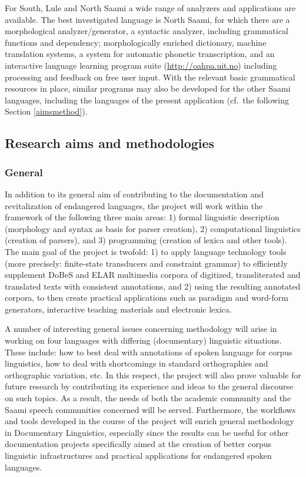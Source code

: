 \documentclass[a4paper,12pt]{article}
\begin{document}
For South, Lule and North Saami a wide range of analyzers and applications are available. The best investigated language is North Saami, for which there are a morphological analyzer/generator, a syntactic analyzer, including grammatical functions and dependency; morphologically enriched dictionary, machine translation systems, a system for automatic phonetic transcription, and an interactive language learning program suite (\url{http://oahpa.uit.no}) including processing and feedback on free user input. With the relevant basic grammatical resources in place, similar programs may also be developed for the other Saami languages, including the languages of the present application (cf.~the following Section \ref{aimsmethod}).

\subsection{Research aims and methodologies}\label{method}
\subsubsection{General}%

In addition to its general aim of contributing to the documentation and revitalization of endangered languages, the project will work within the framework of the following three main areas: 1) formal linguistic description (morphology and syntax as basis for parser creation), 2) computational linguistics (creation of parsers), and 3) programming (creation of lexica and other tools). The main goal of the project is twofold: 1) to apply language technology tools (more precisely: finite-state transducers and constraint grammar) to efficiently supplement DoBeS and ELAR multimedia corpora of digitized, transliterated and translated texts with consistent annotations, and 2) using the resulting annotated corpora, to then create practical applications such as paradigm and word-form generators, interactive teaching materials and electronic lexica. 

A number of interesting general issues concerning methodology will arise in working on four languages with differing (documentary) linguistic situations. These include: how to best deal with annotations of spoken language for corpus linguistics, how to deal with shortcomings in standard orthographies and orthographic variation, etc. In this respect, the project will also prove valuable for future research by contributing its experience and ideas to the general discourse on such topics. As a result, the needs of both the academic community and the Saami speech communities concerned will be served. Furthermore, the workflows and tools developed in the course of the project will enrich general methodology in Documentary Linguistics, especially since the results can be useful for other documentation projects specifically aimed at the creation of better corpus linguistic infrastructures and practical applications for endangered spoken languages.
\end{document}
